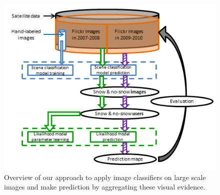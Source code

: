 \begin{figure}[h!]
\centering
\includegraphics[scale=0.7]{figure/flowchartWevaluation.png}
\caption{Overview of our approach to apply image classifiers on large scale images and make prediction by aggregating these visual evidence.}
\label{fig:overview}
\end{figure}

